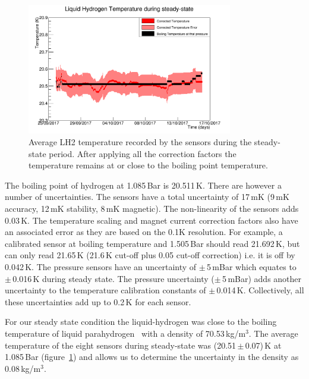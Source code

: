 \begin{figure}[htb!]
  \begin{center}
  \includegraphics[width=0.80\textwidth]{11-Absorber/Figures/SteadyState60mK.png}
  \end{center}
  \caption{Average LH2 temperature recorded by the sensors during the steady-state period. After applying all the correction factors the temperature remains at or close to the boiling point temperature.}
  \label{Fig:TempCalibrated}
\end{figure}
 
The boiling point of hydrogen at 1.085\,Bar is 20.511\,K. There are however a number of uncertainties.
The sensors have a total uncertainty of 17\,mK (9\,mK accuracy, 12\,mK stability, 8\,mK magnetic). The non-linearity of the sensors adds 0.03\,K.
The temperature scaling and magnet current correction factors also have an associated error as they are based on the 0.1K resolution.
For example, a calibrated sensor at boiling temperature and 1.505\,Bar should read 21.692\,K, but can only read 21.65\,K (21.6\,K cut-off plus 0.05 cut-off correction) i.e. it is off by 0.042\,K. The pressure sensors have an uncertainty of $\mathrm{\pm}$\,5\,mBar which equates to $\mathrm{\pm}$\,0.016\,K during steady state.
The pressure uncertainty ($\mathrm{\pm}$\,5\,mBar) adds another uncertainty to the temperature calibration constants of $\mathrm{\pm}$\,0.014\,K. Collectively, all these uncertainties add up to 0.2\,K for each sensor.
 
For our steady state condition the liquid-hydrogen was close to the boiling temperature of liquid parahydrogen~\cite{NOTE524} with a density of 70.53\,kg/m$^{3}$. The average temperature of the eight sensors during steady-state was (20.51\,$\mathrm{\pm}$\,0.07)\,K at 1.085\,Bar (figure~\ref{Fig:TempCalibrated}) and allows us to determine the uncertainty in the density as 0.08\,kg/m$^{3}$.
 

